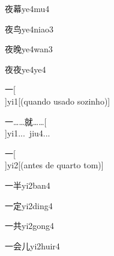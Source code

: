 \begin{verbete}[8;13]{夜幕}{ye4mu4}
\end{verbete}

\begin{verbete}[8;5]{夜鸟}{ye4niao3}
\end{verbete}

\begin{verbete}[8;11]{夜晚}{ye4wan3}
\end{verbete}

\begin{verbete}[8;6]{夜夜}{ye4ye4}
\end{verbete}

\begin{verbete}[1]{一}[\\]{yi1}[(quando usado sozinho)]
\end{verbete}

\begin{verbete}[1;8]{一……就……}[\\]{yi1...\ jiu4...}
\end{verbete}

\begin{verbete}[1]{一}[\\]{yi2}[(antes de quarto tom)]
\end{verbete}

\begin{verbete}[1;5]{一半}{yi2ban4}
\end{verbete}

\begin{verbete}[1;8]{一定}{yi2ding4}
\end{verbete}

\begin{verbete}[1;6]{一共}{yi2gong4}
\end{verbete}

\begin{verbete}[1;6;2]{一会儿}{yi2huir4}
\end{verbete}

